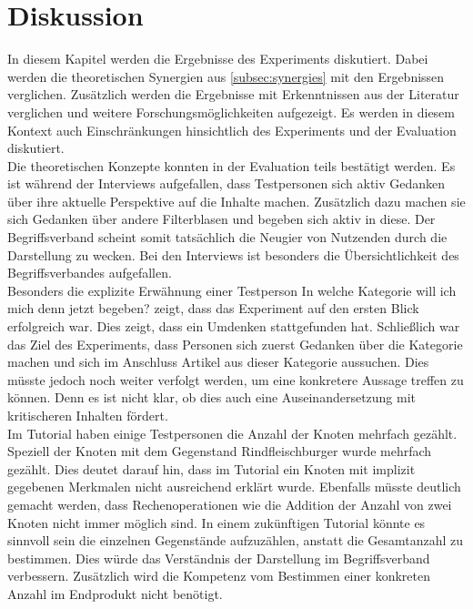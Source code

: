 \section{Diskussion}\label{sec:discussion}
In diesem Kapitel werden die Ergebnisse des Experiments diskutiert.
Dabei werden die theoretischen Synergien aus \autoref{subsec:synergies} mit den Ergebnissen verglichen.
Zusätzlich werden die Ergebnisse mit Erkenntnissen aus der Literatur verglichen und weitere Forschungsmöglichkeiten aufgezeigt.
Es werden in diesem Kontext auch Einschränkungen hinsichtlich des Experiments und der Evaluation diskutiert.\\

Die theoretischen Konzepte konnten in der Evaluation teils bestätigt werden.
Es ist während der Interviews aufgefallen, dass Testpersonen sich aktiv Gedanken über ihre aktuelle Perspektive auf die Inhalte machen.
Zusätzlich dazu machen sie sich Gedanken über andere Filterblasen und begeben sich aktiv in diese.
Der Begriffsverband scheint somit tatsächlich die Neugier von Nutzenden durch die Darstellung zu wecken.
Bei den Interviews ist besonders die Übersichtlichkeit des Begriffsverbandes aufgefallen. \\

Besonders die explizite Erwähnung einer Testperson \glqq In welche Kategorie will ich mich denn jetzt begeben?\grqq{} zeigt, dass das Experiment auf den ersten Blick erfolgreich war.
Dies zeigt, dass ein Umdenken stattgefunden hat.
Schließlich war das Ziel des Experiments, dass Personen sich zuerst Gedanken über die Kategorie machen und sich im Anschluss Artikel aus dieser Kategorie aussuchen.
Dies müsste jedoch noch weiter verfolgt werden, um eine konkretere Aussage treffen zu können.
Denn es ist nicht klar, ob dies auch eine Auseinandersetzung mit kritischeren Inhalten fördert. \\

Im Tutorial haben einige Testpersonen die Anzahl der Knoten mehrfach gezählt.
Speziell der Knoten mit dem Gegenstand Rindfleischburger wurde mehrfach gezählt.
Dies deutet darauf hin, dass im Tutorial ein Knoten mit implizit gegebenen Merkmalen nicht ausreichend erklärt wurde.
Ebenfalls müsste deutlich gemacht werden, dass Rechenoperationen wie die Addition der Anzahl von zwei Knoten nicht immer möglich sind.
In einem zukünftigen Tutorial könnte es sinnvoll sein die einzelnen Gegenstände aufzuzählen, anstatt die Gesamtanzahl zu bestimmen.
Dies würde das Verständnis der Darstellung im Begriffsverband verbessern.
Zusätzlich wird die Kompetenz vom Bestimmen einer konkreten Anzahl im Endprodukt nicht benötigt. \\

